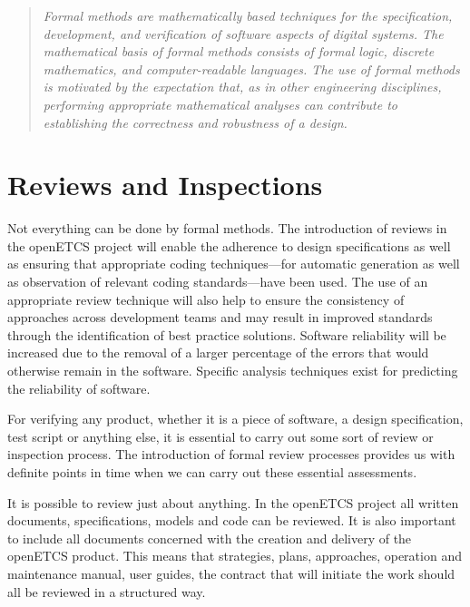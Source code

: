 \begin{quote}
{\em Formal methods are mathematically based techniques for the
specification, development, and verification of software aspects of
digital systems.
%
The mathematical basis of formal methods consists
of formal logic, discrete mathematics, and computer-readable
languages.
%
The use of formal methods is motivated by the expectation
that, as in other engineering disciplines, performing appropriate
mathematical analyses can contribute to establishing the correctness
and robustness of a design.}

\hfill
\cite[Section~1.0, p.1]{DO-333}
\end{quote}


\chapter{Reviews and Inspections}
\label{sec:reviews-inspec}

Not everything can be done by formal methods. The introduction of reviews
 in the openETCS project will enable the
adherence to design specifications as well as ensuring that
appropriate coding techniques---for automatic generation as well as 
observation of relevant coding
standards---have been used.  The use of an appropriate review technique
will also help to ensure the consistency of approaches across development teams
and may result in improved standards through the identification of
best practice solutions.  Software reliability will be increased due
to the removal of a larger percentage of the errors that would
otherwise remain in the software. Specific analysis techniques
exist for predicting the reliability of software.

For verifying any product, whether it is a piece of
software, a design specification, test script or anything else, it is 
essential to carry out some sort of review or inspection process. 
The introduction of formal review processes provides us with 
definite points in time when we can carry out these essential 
assessments.

It is possible to review just about anything. In the openETCS project
all written documents, specifications, models and code can be
reviewed. It is also important to include all documents concerned with
the creation and delivery of the openETCS product. This means that
strategies, plans, approaches, operation and maintenance manual, user
guides, the contract that will initiate the work should all be
reviewed in a structured way.

